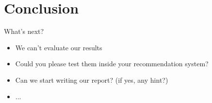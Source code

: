 \documentclass[xcolor=dvipsnames]{beamer}
\begin{document}
\section{Conclusion}

\begin{frame}{What's next?}
\begin{itemize}
\item We can't evaluate our results
\item Could you please test them inside your recommendation system?
\item Can we start writing our report? (if yes, any hint?)
\item ...
\end{itemize}
\end{frame}

\end{document}
